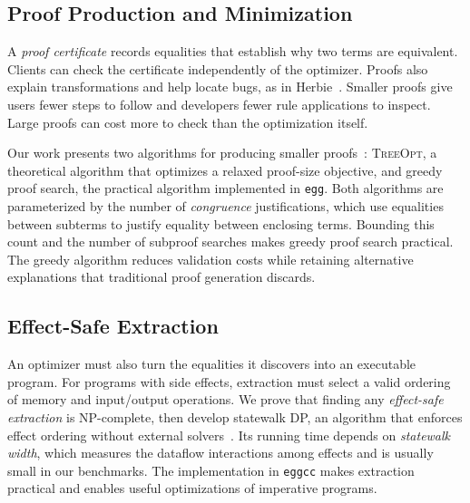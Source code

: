 \subsection{Proof Production and Minimization}
\label{sec:intro-proofs}

A \emph{proof certificate} records equalities that establish why two terms are equivalent.
Clients can check the certificate independently of the optimizer.
Proofs also explain transformations and help locate bugs, as in Herbie~\cite{herbie-proofs}.
Smaller proofs give users fewer steps to follow and developers fewer rule applications to inspect.
Large proofs can cost more to check than the optimization itself.

Our work presents two algorithms for producing smaller proofs~\cite{eggproof}:
  \textsc{TreeOpt}, a theoretical algorithm that optimizes a relaxed proof-size objective,
  and greedy proof search, the practical algorithm implemented in \texttt{egg}.
Both algorithms are parameterized by the number of \emph{congruence} justifications,
  which use equalities between subterms to justify equality between enclosing terms.
Bounding this count and the number of subproof searches makes greedy proof search practical.
The greedy algorithm reduces validation costs while retaining alternative explanations
  that traditional proof generation discards.

\subsection{Effect-Safe Extraction}
\label{sec:intro-extraction}

An optimizer must also turn the equalities it discovers into an executable program.
For programs with side effects, extraction must select a valid ordering of memory
  and input/output operations.
We prove that finding any \emph{effect-safe extraction} is NP-complete,
  then develop statewalk DP, an algorithm that enforces effect ordering without external solvers~\cite{eggcc}.
Its running time depends on \emph{statewalk width},
  which measures the dataflow interactions among effects and is usually small in our benchmarks.
The implementation in \texttt{eggcc} makes extraction practical
  and enables useful optimizations of imperative programs.

